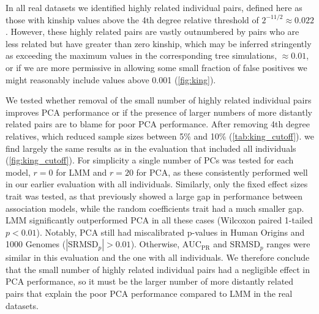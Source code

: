 \documentclass[11pt]{article}
\newcommand{\rmsd}{\text{SRMSD}_p}
\newcommand{\auc}{\text{AUC}_\text{PR}}
\begin{document}
In all real datasets we identified highly related individual pairs, defined here as those with kinship values above the 4th degree relative threshold of $2^{-11/2} \approx 0.022$ \citep{manichaikul_robust_2010, conomos_model-free_2016}.
However, these highly related pairs are vastly outnumbered by pairs who are less related but have greater than zero kinship, which may be inferred stringently as exceeding the maximum values in the corresponding tree simulations, $\approx 0.01$, or if we are more permissive in allowing some small fraction of false positives we might reasonably include values above 0.001 (\cref{fig:king}).

We tested whether removal of the small number of highly related individual pairs improves PCA performance or if the presence of larger numbers of more distantly related pairs are to blame for poor PCA performance.
After removing 4th degree relatives, which reduced sample sizes between 5\% and 10\% (\cref{tab:king_cutoff}). we find largely the same results as in the evaluation that included all individuals (\cref{fig:king_cutoff}).
For simplicity a single number of PCs was tested for each model, $r=0$ for LMM and $r=20$ for PCA, as these consistently performed well in our earlier evaluation with all individuals.
Similarly, only the fixed effect sizes trait was tested, as that previously showed a large gap in performance between association models, while the random coefficients trait had a much smaller gap.
LMM significantly outperformed PCA in all these cases (Wilcoxon paired 1-tailed $p < 0.01$).
Notably, PCA still had miscalibrated p-values in Human Origins and 1000 Genomes ($|\rmsd| > 0.01$).
Otherwise, $\auc$ and $\rmsd$ ranges were similar in this evaluation and the one with all individuals.
We therefore conclude that the small number of highly related individual pairs had a negligible effect in PCA performance, so it must be the larger number of more distantly related pairs that explain the poor PCA performance compared to LMM in the real datasets.
\end{document}
